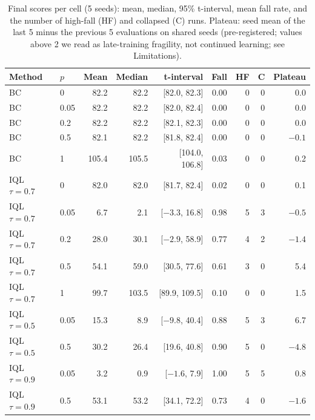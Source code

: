 \documentclass{article}
\begin{document}
\begin{table}[t]
  \caption{Final scores per cell (5 seeds): mean, median, 95\% t-interval, mean fall rate, and the number of high-fall (HF) and collapsed (C) runs. Plateau: seed mean of the last 5 minus the previous 5 evaluations on shared seeds (pre-registered; values above 2 we read as late-training fragility, not continued learning; see Limitations).}
  \label{tab:scores}
  \centering\small
  \begin{tabular}{@{}llrrrrrrr@{}}
    \toprule
    Method & $p$ & Mean & Median & t-interval & Fall & HF & C & Plateau \\
    \midrule
    BC & 0 & 82.2 & 82.2 & [82.0, 82.3] & 0.00 & 0 & 0 & 0.0 \\
    BC & 0.05 & 82.2 & 82.2 & [82.0, 82.4] & 0.00 & 0 & 0 & 0.0 \\
    BC & 0.2 & 82.2 & 82.2 & [82.1, 82.3] & 0.00 & 0 & 0 & 0.0 \\
    BC & 0.5 & 82.1 & 82.2 & [81.8, 82.4] & 0.00 & 0 & 0 & $-0.1$ \\
    BC & 1 & 105.4 & 105.5 & [104.0, 106.8] & 0.03 & 0 & 0 & 0.2 \\
    \midrule
    IQL $\tau{=}0.7$ & 0 & 82.0 & 82.0 & [81.7, 82.4] & 0.02 & 0 & 0 & 0.1 \\
    IQL $\tau{=}0.7$ & 0.05 & 6.7 & 2.1 & [$-3.3$, 16.8] & 0.98 & 5 & 3 & $-0.5$ \\
    IQL $\tau{=}0.7$ & 0.2 & 28.0 & 30.1 & [$-2.9$, 58.9] & 0.77 & 4 & 2 & $-1.4$ \\
    IQL $\tau{=}0.7$ & 0.5 & 54.1 & 59.0 & [30.5, 77.6] & 0.61 & 3 & 0 & 5.4 \\
    IQL $\tau{=}0.7$ & 1 & 99.7 & 103.5 & [89.9, 109.5] & 0.10 & 0 & 0 & 1.5 \\
    \midrule
    IQL $\tau{=}0.5$ & 0.05 & 15.3 & 8.9 & [$-9.8$, 40.4] & 0.88 & 5 & 3 & 6.7 \\
    IQL $\tau{=}0.5$ & 0.5 & 30.2 & 26.4 & [19.6, 40.8] & 0.90 & 5 & 0 & $-4.8$ \\
    IQL $\tau{=}0.9$ & 0.05 & 3.2 & 0.9 & [$-1.6$, 7.9] & 1.00 & 5 & 5 & 0.8 \\
    IQL $\tau{=}0.9$ & 0.5 & 53.1 & 53.2 & [34.1, 72.2] & 0.73 & 4 & 0 & $-1.6$ \\
    \bottomrule
  \end{tabular}
\end{table}
\end{document}
